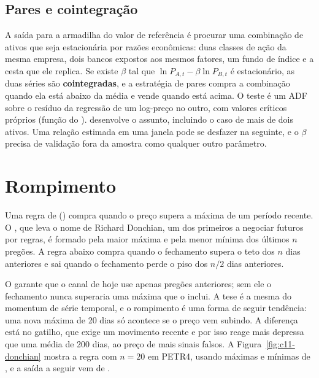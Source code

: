 \subsection{Pares e cointegração}

A saída para a armadilha do valor de referência é procurar uma combinação de ativos que seja estacionária por razões econômicas: duas classes de ação da mesma empresa, dois bancos expostos aos mesmos fatores, um fundo de índice e a cesta que ele replica. Se existe $\beta$ tal que $\ln P_{A,t} - \beta \ln P_{B,t}$ é estacionário, as duas séries são \textbf{cointegradas}, e a estratégia de pares compra a combinação quando ela está abaixo da média e vende quando está acima. O teste é um ADF sobre o resíduo da regressão de um log-preço no outro, com valores críticos próprios (função  do ). \citet{chan2013} desenvolve o assunto, incluindo o caso de mais de dois ativos. Uma relação estimada em uma janela pode se desfazer na seguinte, e o $\beta$ precisa de validação fora da amostra como qualquer outro parâmetro.

\section{Rompimento}
\label{sec:c11-rompimento}

Uma regra de  () compra quando o preço supera a máxima de um período recente. O , que leva o nome de Richard Donchian, um dos primeiros a negociar futuros por regras, é formado pela maior máxima e pela menor mínima dos últimos $n$ pregões. A regra abaixo compra quando o fechamento supera o teto dos $n$ dias anteriores e sai quando o fechamento perde o piso dos $n/2$ dias anteriores.



O  garante que o canal de hoje use apenas pregões anteriores; sem ele o fechamento nunca superaria uma máxima que o inclui. A tese é a mesma do momentum de série temporal, e o rompimento é uma forma de seguir tendência: uma nova máxima de 20 dias só acontece se o preço vem subindo. A diferença está no gatilho, que exige um movimento recente e por isso reage mais depressa que uma média de 200 dias, ao preço de mais sinais falsos. A Figura~\ref{fig:c11-donchian} mostra a regra com $n = 20$ em PETR4, usando máximas e mínimas de , e a saída a seguir vem de .

